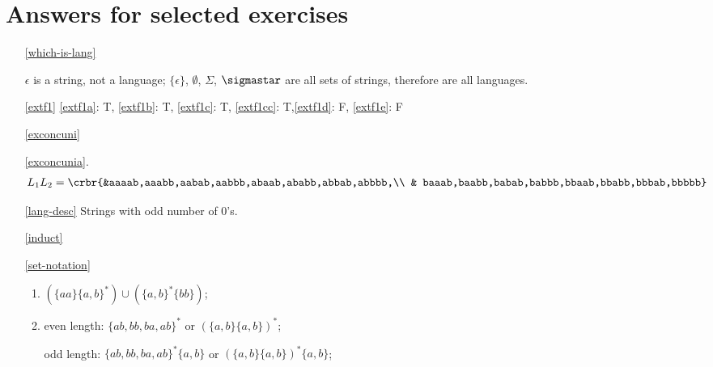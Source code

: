 \documentclass[11pt]{article}
\newcommand{\emptystring}{\ensuremath{\epsilon}}
\begin{document}
\section{Answers for selected exercises}
\begin{itemize}

\item[\ref{which-is-lang}] 

$\emptystring$ is a string, not a language; $\{\emptystring\}$,
$\emptyset$, $\Sigma$, $\sigmastar$ are all
sets of strings, therefore are all languages. 

\item[\ref{extf1}]\hypertarget{extf1sol}{} \ref{extf1a}: T, \ref{extf1b}: T, \ref{extf1c}: T, \ref{extf1cc}: T,\ref{extf1d}: F, \ref{extf1e}: F

\item[\ref{exconcuni}]\hypertarget{exconcunisol}{}

\ref{exconcunia}.
\begin{align*}
L_1L_2= \crbr{&aaaab,aaabb,aabab,aabbb,abaab,ababb,abbab,abbbb,\\
& baaab,baabb,babab,babbb,bbaab,bbabb,bbbab,bbbbb}
\end{align*}



\item[\ref{lang-desc}]\hypertarget{lang-desc-sol}{} Strings with odd number of 0's. 

\item[\ref{induct}]\hypertarget{induct-sol}{}


\item[\ref{set-notation}]
\begin{enumerate}
\item  $(\{aa\}\{a,b\}^*)\cup(\{a,b\}^*\{bb\})$;


\item even length:
$\{ab,bb,ba,ab\}^*$ or $(\{a,b\}\{a,b\})^*$;

odd length:
$\{ab,bb,ba,ab\}^*\{a,b\}$ or $(\{a,b\}\{a,b\})^*\{a,b\}$;



\end{enumerate}
\end{itemize}
\end{document}
